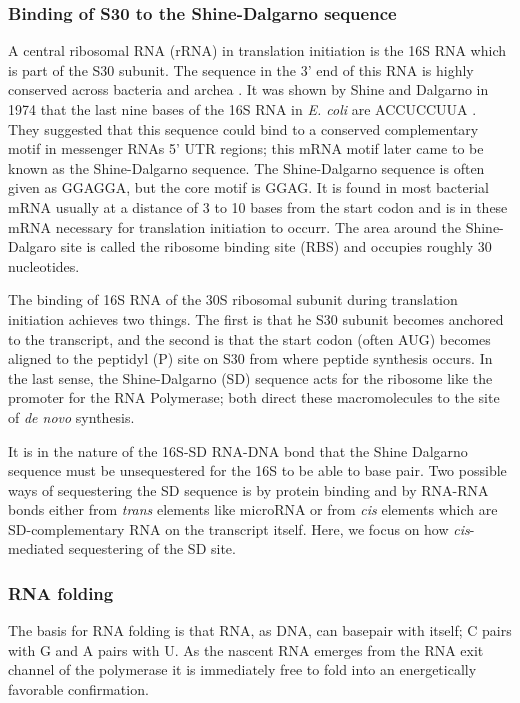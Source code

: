 \subsubsection{Binding of S30 to the Shine-Dalgarno sequence}

A central ribosomal RNA (rRNA) in translation initiation is the 16S RNA which
is part of the S30 subunit. The sequence in the 3' end of this RNA is highly
conserved across bacteria and archea \cite{nakagawa_dynamic_2010}. It was shown
by Shine and Dalgarno in 1974 that the last nine bases of the 16S RNA in 
\textit{E. coli} are ACCUCCUUA \cite{shine_3-terminal_1974}. They suggested
that this sequence could bind to a conserved complementary motif in messenger
RNAs 5' UTR regions; this mRNA motif later came to be known as the
Shine-Dalgarno sequence. The Shine-Dalgarno sequence is often given as GGAGGA,
but the core motif is GGAG. It is found in most bacterial mRNA usually at a
distance of 3 to 10 bases from the start codon \cite{chen_determination_1994-1}
and is in these mRNA necessary for translation initiation to occurr. The area
around the Shine-Dalgaro site is called the ribosome binding site (RBS) and
occupies roughly 30 nucleotides.

The binding of 16S RNA of the 30S ribosomal subunit during translation
initiation achieves two things. The first is that he S30 subunit becomes
anchored to the transcript, and the second is that the start codon (often AUG)
becomes aligned to the peptidyl (P) site on S30 from where peptide synthesis
occurs. In the last sense, the Shine-Dalgarno (SD) sequence acts for the
ribosome like the promoter for the RNA Polymerase; both direct these
macromolecules to the site of \textit{de novo} synthesis.

It is in the nature of the 16S-SD RNA-DNA bond that the Shine Dalgarno
sequence must be unsequestered for the 16S to be able to base pair. Two possible
ways of sequestering the SD sequence is by protein binding and by RNA-RNA bonds
either from \textit{trans} elements like microRNA or from \textit{cis} elements
which are SD-complementary RNA on the transcript itself. Here, we focus on how
\textit{cis}-mediated sequestering of the SD site.

\subsubsection{RNA folding}
The basis for RNA folding is that RNA, as DNA, can basepair with itself; C
pairs with G and A pairs with U. As the nascent RNA emerges from the RNA exit
channel of the polymerase it is immediately free to fold into an energetically
favorable confirmation.

